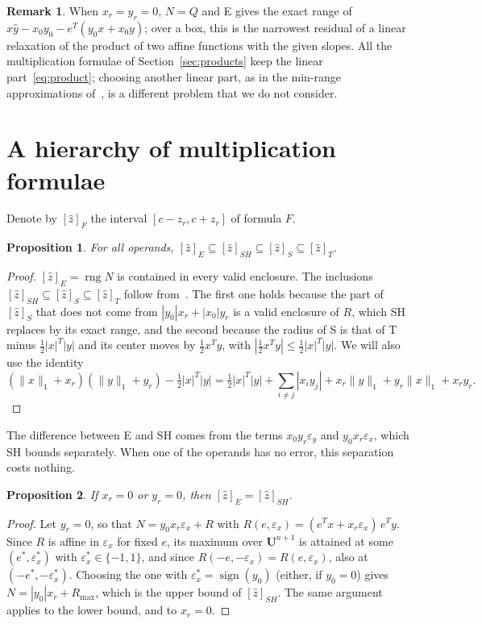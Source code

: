 \documentclass[11pt]{article}
\newtheorem{propo}{Proposition}
\theoremstyle{definition}
\newtheorem{remark}{Remark}
\newcommand{\U}{\mathbf{U}}
\newcommand{\eps}{\varepsilon}
\newcommand{\ex}{\eps_x}
\newcommand{\ey}{\eps_y}
\newcommand{\rng}{\operatorname{rng}}
\begin{document}
\begin{remark}
When $x_r=y_r=0$, $N=Q$ and E gives the exact range of $\hat x\hat y - x_0y_0 - e^T(y_0x+x_0y)$; over a box, this is the narrowest residual of a linear relaxation of the product of two affine functions with the given slopes. All the multiplication formulae of Section~\ref{sec:products} keep the linear part~\eqref{eq:product}; choosing another linear part, as in the min-range approximations of~\cite{stolfi1997self,skalna2013minrange}, is a different problem that we do not consider.
\end{remark}

\section{A hierarchy of multiplication formulae}
\label{sec:hierarchy}

Denote by $[\hat z]_F$ the interval $[c-z_r,c+z_r]$ of formula $F$.

\begin{propo}
\label{prop:chain}
For all operands, $[\hat z]_E \subseteq [\hat z]_{SH}\subseteq[\hat z]_S\subseteq[\hat z]_T$.
\end{propo}
\begin{proof}
$[\hat z]_E=\rng N$ is contained in every valid enclosure. The inclusions $[\hat z]_{SH}\subseteq[\hat z]_S\subseteq[\hat z]_T$ follow from~\cite[Prop.~3]{skalna2017new}. The first one holds because the part of $[\hat z]_S$ that does not come from $|y_0|x_r+|x_0|y_r$ is a valid enclosure of $R$, which SH replaces by its exact range, and the second because the radius of S is that of T minus $\tfrac12|x|^T|y|$ and its center moves by $\tfrac12x^Ty$, with $|\tfrac12x^Ty|\le\tfrac12|x|^T|y|$. We will also use the identity
\[
(\|x\|_1+x_r)(\|y\|_1+y_r) - \tfrac12|x|^T|y| = \tfrac12|x|^T|y|+\sum_{i\ne j}|x_iy_j| + x_r\|y\|_1+y_r\|x\|_1+x_ry_r .
\]
\end{proof}

The difference between E and SH comes from the terms $x_0y_r\ey$ and $y_0x_r\ex$, which SH bounds separately. When one of the operands has no error, this separation costs nothing.

\begin{propo}
\label{prop:oneerror}
If $x_r=0$ or $y_r=0$, then $[\hat z]_E=[\hat z]_{SH}$.
\end{propo}
\begin{proof}
Let $y_r=0$, so that $N = y_0x_r\ex + R$ with $R(e,\ex)=(e^Tx+x_r\ex)\,e^Ty$. Since $R$ is affine in $\ex$ for fixed $e$, its maximum over $\U^{n+1}$ is attained at some $(e^*,\ex^*)$ with $\ex^*\in\{-1,1\}$, and since $R(-e,-\ex)=R(e,\ex)$, also at $(-e^*,-\ex^*)$. Choosing the one with $\ex^*=\operatorname{sign}(y_0)$ (either, if $y_0=0$) gives $N = |y_0|x_r + R_{\max}$, which is the upper bound of $[\hat z]_{SH}$. The same argument applies to the lower bound, and to $x_r=0$.
\end{proof}
\end{document}
